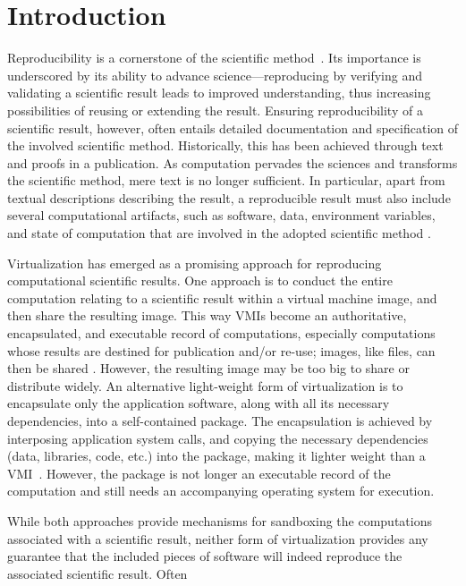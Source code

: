 \section{Introduction}

Reproducibility is a cornerstone of the scientific method~\cite{borgman2012data}. 
Its importance is underscored by its ability to advance science---reproducing by verifying and validating a scientific result leads to improved understanding, thus increasing possibilities of reusing or extending the result. 
Ensuring reproducibility of a scientific result, however, often entails detailed documentation and specification of the involved scientific method. Historically, this has been achieved through text and proofs in a publication. 
As computation pervades the sciences and transforms the scientific method, mere text is no longer sufficient. 
In particular, apart from textual descriptions describing the result, a reproducible result must also include several computational artifacts, such as software, data,  environment variables, and state of computation that are involved in the adopted scientific method \cite{Sole}.  

Virtualization has emerged as a promising approach for reproducing computational scientific results. One approach is to conduct the entire computation relating to a scientific result within a virtual machine image, and then share the resulting image. This way VMIs become an authoritative, encapsulated, and executable record of computations, especially computations whose results are destined for publication and/or re-use; images, like files, can then be shared \cite{Lampoudi}. 
However, the resulting image may be too big to share or distribute widely. An alternative light-weight form of virtualization is to encapsulate only the application software, along with all its necessary dependencies, into a self-contained package. The encapsulation is achieved by interposing application system calls, and copying the necessary dependencies (data, libraries, code, etc.) into the package, making it lighter weight than a VMI~\cite{guo2011cde}. However, the package is not longer an executable record of the computation and still needs an accompanying operating system for execution. 

While both approaches provide mechanisms for sandboxing the computations associated with a scientific result, neither form of virtualization provides any guarantee that the included pieces of software will indeed reproduce the associated scientific result. Often 

